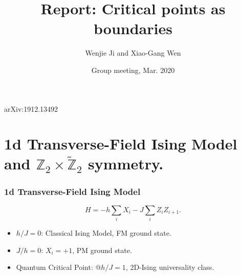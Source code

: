 \documentclass[xcolor=table, 10pt, aspectratio=169]{beamer}
\title[CP as Bdry] %
{Report: Critical points as boundaries}
\author %
{Wenjie Ji and Xiao-Gang Wen}
\date{Group meeting, Mar. 2020}
\begin{document}
\begin{frame}
  \titlepage

  \begin{center}
    arXiv:1912.13492
  \end{center}
\end{frame}

\section{1d Transverse-Field Ising Model and $\mathbb Z_2\times\tilde{\mathbb Z}_2$ symmetry.}

\begin{frame}
  \frametitle{1d Transverse-Field Ising Model}
  \[H=-h\sum_i X_i-J\sum_i Z_iZ_{i+1}.\]
  \begin{itemize}
    \item $h/J=0$: Classical Ising Model, FM ground state.
    \item $J/h=0$: $X_i=+1$, PM ground state.
    \item Quantum Critical Point: @$h/J=1$, 2D-Ising universality class.
  \end{itemize}
  \begin{center}
  \end{center}
\end{frame}
\end{document}
